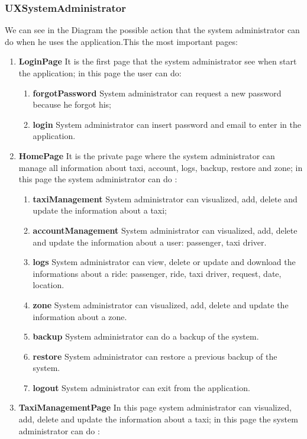 \documentclass[11pt, a4paper,titlepage]{article}
\begin{document}
	\subsubsection{UXSystemAdministrator}
	We can see in the Diagram the possible action that the system administrator can do when he uses the application.This the most important pages:
	\begin{enumerate}
		\item \textbf{LoginPage} It is the first page that the system administrator see when start the application; in this page the user can do:
		\begin{enumerate}
			\item \textbf{forgotPassword} System administrator can request a new password because he forgot his;
			\item \textbf{login} System administrator can insert password and email to enter in the application.
		\end{enumerate}
		\item \textbf{HomePage} It is the private page where the system administrator can manage all information about taxi, account, logs, backup, restore and zone; in this page the system administrator can do :
		\begin{enumerate}
			\item \textbf{taxiManagement} System administrator can visualized, add, delete and update the information about a taxi;
			\item \textbf{accountManagement} System administrator can visualized, add, delete and update the information about a user: passenger, taxi driver.
			\item \textbf{logs} System administrator can view, delete or update and download the informations about a ride: passenger, ride, taxi driver, request, date, location.
			\item \textbf{zone} System administrator can visualized, add, delete and update the information about a zone.
			\item \textbf{backup} System administrator can do a backup of the system.
			\item \textbf{restore} System administrator can restore a previous backup of the system.
			\item \textbf{logout} System administrator can exit from the application.
		\end{enumerate}
		\item \textbf{TaxiManagementPage} In this page system administrator can  visualized, add, delete and update the information about a taxi; in this page the system  administrator can do :

\end{enumerate}
\end{document}
